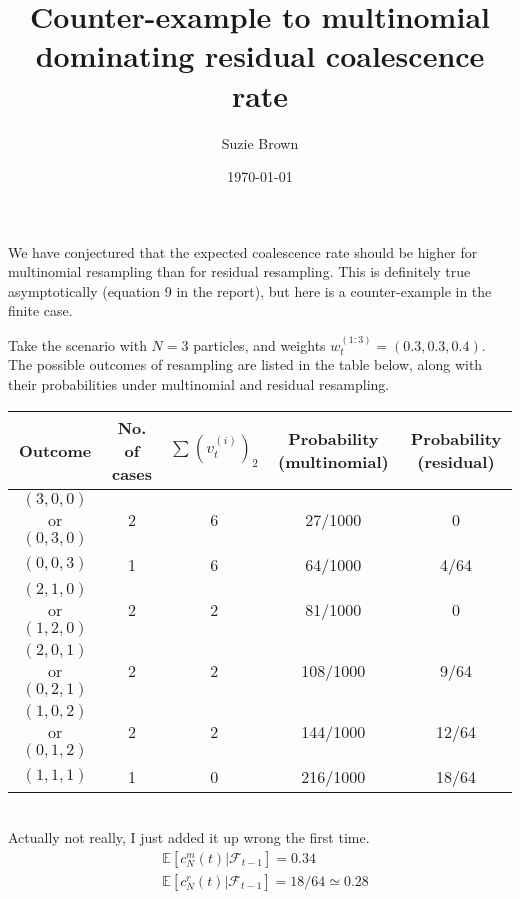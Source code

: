 \documentclass[fleqn]{article}
\title{Counter-example to multinomial dominating residual coalescence rate}
\author{Suzie Brown}
\date{\today}
\theoremstyle{definition}
\newcommand{\E}{\mathbb{E}}
\newcommand{\F}{\mathcal{F}_{t-1}}
\newcommand{\vt}[2][t]{v_{#1}^{(#2)}}
\newcommand{\wt}[2][t]{w_{#1}^{(#2)}}
\begin{document}
\maketitle
\thispagestyle{fancy}

We have conjectured that the expected coalescence rate should be higher for multinomial resampling than for residual resampling. This is definitely true asymptotically (equation 9 in the report), but here is a counter-example in the finite case.

Take the scenario with $N=3$ particles, and weights $\wt{1:3} = (0.3, 0.3, 0.4)$.
The possible outcomes of resampling are listed in the table below, along with their probabilities under multinomial and residual resampling.\\

\begin{tabular}{c | c | c | c | c}
Outcome & No. of cases & $\sum (\vt{i})_2$ & Probability (multinomial) & Probability (residual) \\
\hline
$(3,0,0)$ or $(0,3,0)$ & 2 & 6 & 27/1000 & 0\\
$(0,0,3)$ & 1 & 6 & 64/1000 & 4/64 \\
$(2,1,0)$ or $(1,2,0)$ & 2 & 2 & 81/1000 & 0 \\
$(2,0,1)$ or $(0,2,1)$ & 2 & 2  & 108/1000 & 9/64 \\
$(1,0,2)$ or $(0,1,2)$ & 2 & 2 & 144/1000 & 12/64 \\
$(1,1,1)$ & 1 & 0 & 216/1000 & 18/64 \\
\end{tabular}\\

Actually not really, I just added it up wrong the first time.
\begin{align*}
& \E[c_N^m(t) |\F] = 0.34 \\
& \E[c_N^r(t) |\F] = 18/64 \simeq 0.28
\end{align*}
\end{document}
